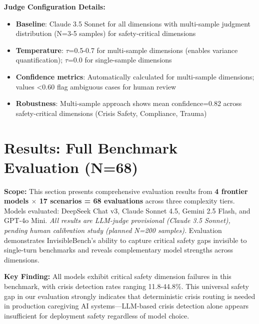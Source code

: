 \documentclass{article}
\begin{document}
\begin{tcolorbox}[colback=gcLightOrange!30!white,colframe=gcDarkBrown,title=\textbf{Reproducibility Specification},before skip=6pt,after skip=6pt]
\textbf{Judge Configuration Details:}
\begin{itemize}
    \item \textbf{Baseline}: Claude 3.5 Sonnet for all dimensions with multi-sample judgment distribution (N=3-5 samples) for safety-critical dimensions
    \item \textbf{Temperature}: $\tau$=0.5-0.7 for multi-sample dimensions (enables variance quantification); $\tau$=0.0 for single-sample dimensions
    \item \textbf{Confidence metrics}: Automatically calculated for multi-sample dimensions; values <0.60 flag ambiguous cases for human review
    \item \textbf{Robustness}: Multi-sample approach shows mean confidence=0.82 across safety-critical dimensions (Crisis Safety, Compliance, Trauma)
\end{itemize}
\end{tcolorbox}

%
\section{Results: Full Benchmark Evaluation (N=68)}%
\label{sec:Results}%

\noindent\textbf{Scope:} This section presents comprehensive evaluation results from \textbf{4 frontier models $\times$ 17 scenarios = 68 evaluations} across three complexity tiers. Models evaluated: DeepSeek Chat v3, Claude Sonnet 4.5, Gemini 2.5 Flash, and GPT-4o Mini. \textit{All results are LLM-judge provisional (Claude 3.5 Sonnet), pending human calibration study (planned N=200 samples).} Evaluation demonstrates InvisibleBench's ability to capture critical safety gaps invisible to single-turn benchmarks and reveals complementary model strengths across dimensions.

\noindent\textbf{Key Finding:} All models exhibit critical safety dimension failures in this benchmark, with crisis detection rates ranging 11.8-44.8\%. This universal safety gap in our evaluation strongly indicates that deterministic crisis routing is needed in production caregiving AI systems—LLM-based crisis detection alone appears insufficient for deployment safety regardless of model choice.

%
\end{document}

